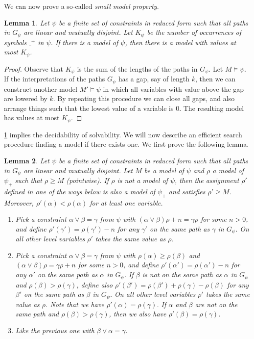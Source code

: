 \documentclass[11pt,a4paper]{article}
\newtheorem{lemma}{Lemma}[theorem]
\begin{document}
We can now prove a so-called \emph{small model property}.
\begin{lemma}\label{lem:small-model}
Let   $\psi$ be a finite set of constraints in reduced form such that all paths in $G_ \psi$ are linear
and mutually disjoint. Let $K_{ \psi}$ be the number of occurrences of symbols $\_^+$ in  $\psi$.
If there is a model of  $\psi$, then there is a model with values at most $K_{ \psi}$.
\end{lemma}

\begin{proof}
Observe that $K_{\psi}$ is the sum of the lengths of the paths in $G_\psi$.
Let $M \models \psi$. If the interpretations of the paths $G_\psi$
has a gap, say of length $k$, then we can construct another model $M' \models \psi$
in which all variables with value above the gap are lowered by $k$. By repeating this procedure we can close all gaps, and also arrange things such that
the lowest value of a variable is $0$. The resulting model
has values at most $K_{\psi}$.
\end{proof}

\cref{lem:small-model} implies the decidability of solvability.
We will now describe an efficient search procedure finding a
model if there exists one. We first prove the following lemma.

\begin{lemma}\label{lem:model-search}
Let   $\psi$ be a finite set of constraints in reduced form such that all paths 
in $G_ \psi$ are linear and mutually disjoint.
Let $M$ be a model of  $\psi$ and $\rho$ a model of $ \psi_+$ such that $\rho\geq M$ (pointwise).
If $\rho$ is not a model of $\psi$, then the assignment $\rho'$ defined in 
one of the ways below is also a model of $ \psi_+$ and satisfies $\rho'\geq M$.
Moreover, $\rho'(\alpha)<\rho(\alpha)$ for at least one variable.
\begin{enumerate}
\item Pick a constraint $\alpha\vee\beta = \gamma$ from  $\psi$ with
$(\alpha\vee\beta)\rho +n = \gamma\rho$ for some $n>0$, and define 
$\rho'(\gamma') = \rho(\gamma')-n$ for any $\gamma'$ on the same path as $\gamma$ in $G_ \psi$.
On all other level variables $\rho'$ takes the same value as $\rho$.
\item Pick a constraint $\alpha\vee\beta = \gamma$ from  $\psi$ with $\rho(\alpha)\geq\rho(\beta)$
and $(\alpha\vee\beta)\rho = \gamma\rho +n$ for some $n>0$, and  define 
$\rho'(\alpha') = \rho(\alpha') -n$ for any $\alpha'$ on the same path as $\alpha$ in $G_ \psi$.
If $\beta$ is not on the same path as $\alpha$ in $G_ \psi$ and $\rho(\beta)>\rho(\gamma)$, define also
$\rho'(\beta') = \rho(\beta') + \rho(\gamma) - \rho(\beta)$ 
for any $\beta'$ on the same path as $\beta$ in $G_ \psi$. 
On all other level variables $\rho'$ takes the same value as $\rho$.
Note that we have $\rho'(\alpha) = \rho(\gamma)$. If $\alpha$ and $\beta$ are
not on the same path and $\rho(\beta)>\rho(\gamma)$, then we also have
$\rho'(\beta) = \rho(\gamma)$.
\item Like the previous one with $\beta\vee\alpha = \gamma$.
\end{enumerate}
\end{lemma}
\end{document}

